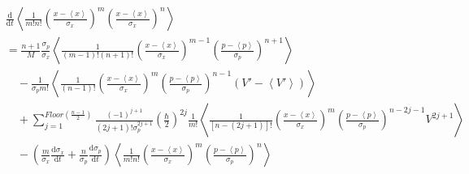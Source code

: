 \documentclass[12pt,a4paper,openany,twoside]{book}
\numberwithin{equation}{section}
\newcommand{\mean}[1]{\left\langle #1 \right\rangle}
\newcommand{\ud}{\mathrm{d}}
\begin{document}
        \vspace{-0.5cm}
        \begin{align*}
          &\frac{\ud}{\ud t}\mean{\frac{1}{m!n!}\left(\frac{x-\mean{x}}{\sigma_x}\right)^m\left(\frac{x-\mean{x}}{\sigma_x}\right)^n}\\
          &= \frac{n+1}{M}\frac{\sigma_p}{\sigma_x}\mean{\frac{1}{(m-1)!(n+1)!}\left(\frac{x-\mean{x}}{\sigma_x}\right)^{m-1}\left(\frac{p-\mean{p}}{\sigma_p}\right)^{n+1}}\\
          &\quad -\frac{1}{\sigma_p m!}\mean{\frac{1}{(n-1)!}\left(\frac{x-\mean{x}}{\sigma_x}\right)^{m}\left(\frac{p-\mean{p}}{\sigma_p}\right)^{n-1}(V'-\mean{V'})}\\
          &\quad + \sum_{j=1}^{Floor(\frac{n-1}{2})}\frac{(-1)^{j+1}}{(2j+1)!\sigma_p^{2j+1}}\left(\frac{\hbar}{2}\right)^{2j}\frac{1}{m!}\mean{\frac{1}{[n-(2j+1)]!}\left(\frac{x-\mean{x}}{\sigma_x}\right)^{m}\left(\frac{p-\mean{p}}{\sigma_p}\right)^{n-2j-1}V^{2j+1}}\\
          &\quad - \left(\frac{m}{\sigma_x}\frac{\ud\sigma_x}{\ud t}+\frac{n}{\sigma_p}\frac{\ud\sigma_p}{\ud t}\right)\mean{\frac{1}{m!n!}\left(\frac{x-\mean{x}}{\sigma_x}\right)^{m}\left(\frac{p-\mean{p}}{\sigma_p}\right)^{n}}
        \end{align*}
\end{document}
